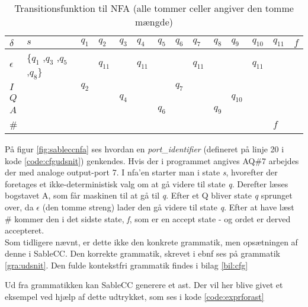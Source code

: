 \begin{table}[H]
\centering
\footnotesize
{}
\begin{tabular}{l@{\hskip\tabcolsep\vrule width 1pt\hskip\tabcolsep}l|l|l|l|l|l|l|l|l|l|l|l|l}

$\delta$         & $s$              & $q_{1}$ & $q_{2}$ & $q_{3}$ & $q_{4}$ & $q_{5}$ & $q_{6}$ & $q_{7}$ & $q_{8}$ & $q_{9}$ & $q_{10}$ & $q_{11}$ & $f$ \\ \bottomrule
$\epsilon$ & \{$q_{1}$ ,$q_{3}$ ,$q_{5}$ ,$q_{8}$\} &   & $q_{11}$ &   & $q_{11}$ & & & $q_{11}$ & & & $q_{11}$ & &\\ 
$I$ & & $q_2$ & &       & &       & $q_7$ & &       &          & &     & \\ 
$Q$ & &       & & $q_4$ & &       &       & &       & $q_{10}$ & &     & \\ 
$A$ & &       & &       & & $q_6$ &       & & $q_9$ &          & &     & \\ 
\#  & &       & &       & &       &       & &       &          & & $f$ & \\
\end{tabular}
	\caption{Transitionsfunktion til NFA (alle tommer celler angiver den tomme mængde)}
    \label{tab:nfadelta}
\end{table}

\noindent På figur \ref{fig:sableccnfa} ses hvordan en \textit{port\_identifier} (defineret på linje 20 i kode \ref{code:cfgudsnit}) genkendes. Hvis der i programmet angives AQ\#7 arbejdes der med analoge output-port 7. I \gls{nfa}'en starter man i state \textit{s}, hvorefter der foretages et ikke-deterministisk valg om at gå videre til state  \textit{q}. Derefter læses bogstavet A, som får maskinen til at gå til \textit{q}. Efter et Q bliver state \textit{q} sprunget over, da $\epsilon$ (den tomme streng) lader den gå videre til state \textit{q}. Efter at have læst \# kommer den i det sidste state, \textit{f}, som er en accept state - og ordet er derved accepteret. \\

\noindent Som tidligere nævnt, er dette ikke den konkrete grammatik, men opsætningen af denne i SableCC. Den korrekte grammatik, skrevet i \gls{ebnf} ses på grammatik \ref{gra:udsnit}. Den fulde kontekstfri grammatik findes i bilag \ref{bil:cfg}



\noindent Ud fra grammatikken kan SableCC generere et \gls{ast}. Der vil her blive givet et eksempel ved hjælp af dette udtrykket, som ses i kode \ref{code:exprforast}


